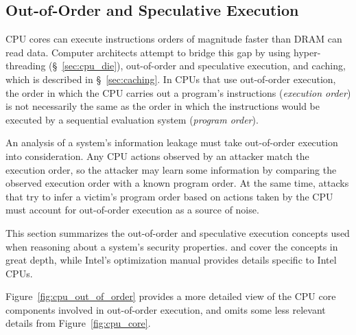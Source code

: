 \subsection{Out-of-Order and Speculative Execution}
\label{sec:out_of_order}


CPU cores can execute instructions orders of magnitude faster than DRAM can
read data. Computer architects attempt to bridge this gap by using
hyper-threading (\S~\ref{sec:cpu_die}), out-of-order and speculative execution,
and caching, which is described in \S~\ref{sec:caching}. In CPUs that use
out-of-order execution, the order in which the CPU carries out a program's
instructions (\textit{execution order}) is not necessarily the same as the
order in which the instructions would be executed by a sequential evaluation
system (\textit{program order}).

An analysis of a system's information leakage must take out-of-order execution
into consideration. Any CPU actions observed by an attacker match the execution
order, so the attacker may learn some information by comparing the observed
execution order with a known program order. At the same time, attacks that try
to infer a victim's program order based on actions taken by the CPU must
account for out-of-order execution as a source of noise.

This section summarizes the out-of-order and speculative execution concepts
used when reasoning about a system's security properties.
\cite{patterson2013architecture} and \cite{hennessy2012architecture} cover the
concepts in great depth, while Intel's optimization manual
\cite{intel2014optimization} provides details specific to Intel CPUs.


Figure~\ref{fig:cpu_out_of_order} provides a more detailed view of the CPU core
components involved in out-of-order execution, and omits some less relevant
details from Figure~\ref{fig:cpu_core}.

